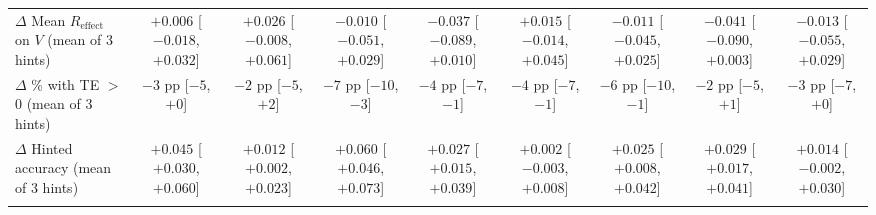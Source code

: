 \begin{table}[htbp]
{\begin{tabular}{lcccccccc}
\addlinespace
$\Delta$ Mean $R_{\mathrm{effect}}$ on $V$ (mean of 3 hints) & \makecell{$+0.006$ \\ \scriptsize[$-0.018$, $+0.032$]} & \makecell{$+0.026$ \\ \scriptsize[$-0.008$, $+0.061$]} & \makecell{$-0.010$ \\ \scriptsize[$-0.051$, $+0.029$]} & \makecell{$-0.037$ \\ \scriptsize[$-0.089$, $+0.010$]} & \makecell{$+0.015$ \\ \scriptsize[$-0.014$, $+0.045$]} & \makecell{$-0.011$ \\ \scriptsize[$-0.045$, $+0.025$]} & \makecell{$-0.041$ \\ \scriptsize[$-0.090$, $+0.003$]} & \makecell{$-0.013$ \\ \scriptsize[$-0.055$, $+0.029$]} \\
\addlinespace
$\Delta$ \% with TE $>$ 0 (mean of 3 hints) & \makecell{$-3$ pp \\ \scriptsize[$-5$, $+0$]} & \makecell{$-2$ pp \\ \scriptsize[$-5$, $+2$]} & \makecell{$-7$ pp \\ \scriptsize[$-10$, $-3$]} & \makecell{$-4$ pp \\ \scriptsize[$-7$, $-1$]} & \makecell{$-4$ pp \\ \scriptsize[$-7$, $-1$]} & \makecell{$-6$ pp \\ \scriptsize[$-10$, $-1$]} & \makecell{$-2$ pp \\ \scriptsize[$-5$, $+1$]} & \makecell{$-3$ pp \\ \scriptsize[$-7$, $+0$]} \\
\addlinespace
$\Delta$ Hinted accuracy (mean of 3 hints) & \makecell{$+0.045$ \\ \scriptsize[$+0.030$, $+0.060$]} & \makecell{$+0.012$ \\ \scriptsize[$+0.002$, $+0.023$]} & \makecell{$+0.060$ \\ \scriptsize[$+0.046$, $+0.073$]} & \makecell{$+0.027$ \\ \scriptsize[$+0.015$, $+0.039$]} & \makecell{$+0.002$ \\ \scriptsize[$-0.003$, $+0.008$]} & \makecell{$+0.025$ \\ \scriptsize[$+0.008$, $+0.042$]} & \makecell{$+0.029$ \\ \scriptsize[$+0.017$, $+0.041$]} & \makecell{$+0.014$ \\ \scriptsize[$-0.002$, $+0.030$]} \\
\addlinespace

\end{tabular}}
\end{table}
